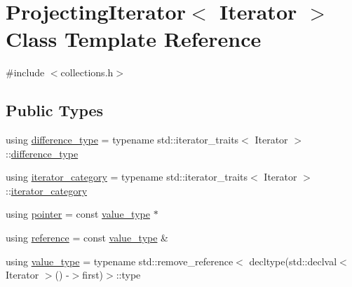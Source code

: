 \hypertarget{classstanfordcpplib_1_1collections_1_1ProjectingIterator}{}\section{Projecting\+Iterator$<$ Iterator $>$ Class Template Reference}
\label{classstanfordcpplib_1_1collections_1_1ProjectingIterator}


{\ttfamily \#include $<$collections.\+h$>$}

\subsection*{Public Types}
\begin{DoxyCompactItemize}
\item 
using \mbox{\hyperlink{classstanfordcpplib_1_1collections_1_1ProjectingIterator_ad050e8e82b0962bb9ebd0e7c23b436ac}{difference\+\_\+type}} = typename std\+::iterator\+\_\+traits$<$ Iterator $>$\+::\mbox{\hyperlink{classstanfordcpplib_1_1collections_1_1ProjectingIterator_ad050e8e82b0962bb9ebd0e7c23b436ac}{difference\+\_\+type}}
\item 
using \mbox{\hyperlink{classstanfordcpplib_1_1collections_1_1ProjectingIterator_ae6c7f7fefb373dec05bf6640b3abb38d}{iterator\+\_\+category}} = typename std\+::iterator\+\_\+traits$<$ Iterator $>$\+::\mbox{\hyperlink{classstanfordcpplib_1_1collections_1_1ProjectingIterator_ae6c7f7fefb373dec05bf6640b3abb38d}{iterator\+\_\+category}}
\item 
using \mbox{\hyperlink{classstanfordcpplib_1_1collections_1_1ProjectingIterator_a6bfec6a77e6f8fac8b106db3094ac7f6}{pointer}} = const \mbox{\hyperlink{classstanfordcpplib_1_1collections_1_1ProjectingIterator_aec6efe17fc77cbe65b6427ab7b2a1b34}{value\+\_\+type}} $\ast$
\item 
using \mbox{\hyperlink{classstanfordcpplib_1_1collections_1_1ProjectingIterator_ab734e7d93a20160ecd4ee87cec8336af}{reference}} = const \mbox{\hyperlink{classstanfordcpplib_1_1collections_1_1ProjectingIterator_aec6efe17fc77cbe65b6427ab7b2a1b34}{value\+\_\+type}} \&
\item 
using \mbox{\hyperlink{classstanfordcpplib_1_1collections_1_1ProjectingIterator_aec6efe17fc77cbe65b6427ab7b2a1b34}{value\+\_\+type}} = typename std\+::remove\+\_\+reference$<$ decltype(std\+::declval$<$ Iterator $>$() -\/$>$first)$>$\+::type
\end{DoxyCompactItemize}
